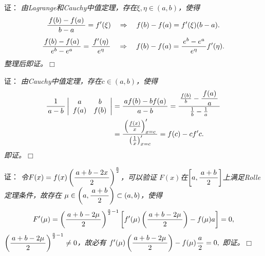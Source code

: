 \begin{frame}
	\linespread{1.5}
	\pause
	
	\bigskip
	
	\small 证：\it
	由Lagrange和Cauchy中值定理，存在$\xi,\eta\in(a,b)$，使得
	$$\displaystyle\frac{\,{f(b)-f(a)}\,}{\,{b-a}\,}=f'(\xi)
	\quad\Rightarrow\quad
	f(b)-f(a)=f'(\xi)(b-a).$$
	$$\displaystyle\frac{\,{f(b)-f(a)}\,}{\,{e^b-e^a}\,}=\displaystyle\frac{\,{f'(\eta)}\,}{\,{e^{\eta}}\,}
	\quad\Rightarrow\quad
	f(b)-f(a)=\displaystyle\frac{\,{e^b-e^a}\,}{\,{e^{\eta}}\,}f'(\eta).$$
	整理后即证。\hfill$\Box$
\end{frame}

\begin{frame}
	\linespread{1.5}
	\pause
	
	\bigskip
	
	\small 证：\it
	由Cauchy中值定理，存在$c\in(a,b)$，使得
	\begin{align*}
		\displaystyle\frac{\,{1}\,}{\,{a-b}\,}\left|\begin{array}{cc}
		a & b\\ f(a) & f(b)
		\end{array}\right|
		&=\displaystyle\frac{\,{af(b)-bf(a)}\,}{\,{a-b}\,}=\displaystyle\frac{\,{\frac{f(b)}b-\displaystyle\frac{\,{f(a)}\,}{\,{a}\,}}\,}{\,{\frac1b-\frac1a}\,}\\
		&=\displaystyle\frac{\,{\left(\frac{f(x)}x\right)'_{x=c}}\,}{\,{\left(\frac1x\right)'_{x=c}}\,}
		=f(c)-cf'c.
	\end{align*}
	即证。\hfill$\Box$
\end{frame}

\begin{frame}
	\linespread{1.5}
	\pause
	
	\bigskip
	
	\small 证：\it
	令$F(x)=f(x)\left(\displaystyle\frac{\,{a+b-2x}\,}{\,{2}\,}\right)^{\frac a2}$，可以验证
	$F(x)$在$\left[a,\displaystyle\frac{\,{a+b}\,}{\,{2}\,}\right]$上满足Rolle定理条件，故存在
	$\mu\in\left(a,\displaystyle\frac{\,{a+b}\,}{\,{2}\,}\right)\subset(a,b)$，使得
	$$F'(\mu)=\left(\displaystyle\frac{\,{a+b-2\mu}\,}{\,{2}\,}\right)^{\frac a2-1}
	\left[f'(\mu)\left(\displaystyle\frac{\,{a+b-2\mu}\,}{\,{2}\,}\right)
	-f(\mu)a\right]=0,$$
	$\left(\displaystyle\frac{\,{a+b-2\mu}\,}{\,{2}\,}\right)^{\frac a2-1}\ne0$，故必有
	$f'(\mu)\left(\displaystyle\frac{\,{a+b-2\mu}\,}{\,{2}\,}\right)-f(\mu)\displaystyle\frac{\,{a}\,}{\,{2}\,}=0,$
	即证。\hfill$\Box$
\end{frame}

